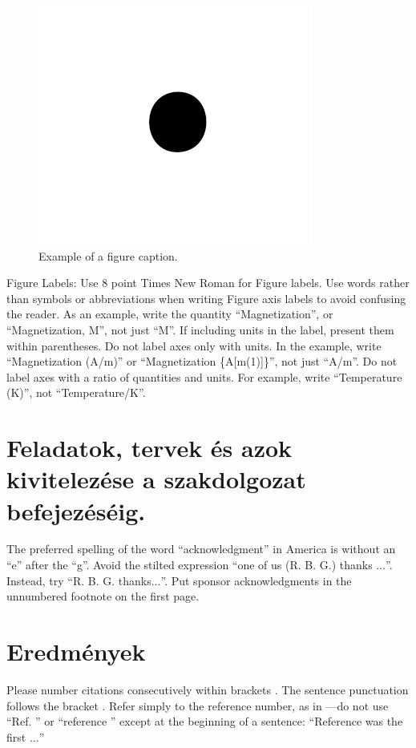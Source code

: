 \documentclass[conference]{IEEEtran}
\begin{document}
\begin{figure}[htbp]
\centerline{\includegraphics{fig1.png}}
\caption{Example of a figure caption.}
\label{fig}
\end{figure}

Figure Labels: Use 8 point Times New Roman for Figure labels. Use words 
rather than symbols or abbreviations when writing Figure axis labels to 
avoid confusing the reader. As an example, write the quantity 
``Magnetization'', or ``Magnetization, M'', not just ``M''. If including 
units in the label, present them within parentheses. Do not label axes only 
with units. In the example, write ``Magnetization (A/m)'' or ``Magnetization 
\{A[m(1)]\}'', not just ``A/m''. Do not label axes with a ratio of 
quantities and units. For example, write ``Temperature (K)'', not 
``Temperature/K''.

\section*{Feladatok, tervek és azok kivitelezése a szakdolgozat befejezéséig.}

The preferred spelling of the word ``acknowledgment'' in America is without 
an ``e'' after the ``g''. Avoid the stilted expression ``one of us (R. B. 
G.) thanks $\ldots$''. Instead, try ``R. B. G. thanks$\ldots$''. Put sponsor 
acknowledgments in the unnumbered footnote on the first page.

\section*{Eredmények}

Please number citations consecutively within brackets \cite{b1}. The 
sentence punctuation follows the bracket \cite{b2}. Refer simply to the reference 
number, as in \cite{b3}---do not use ``Ref. \cite{b3}'' or ``reference \cite{b3}'' except at 
the beginning of a sentence: ``Reference \cite{b3} was the first $\ldots$''
\end{document}
